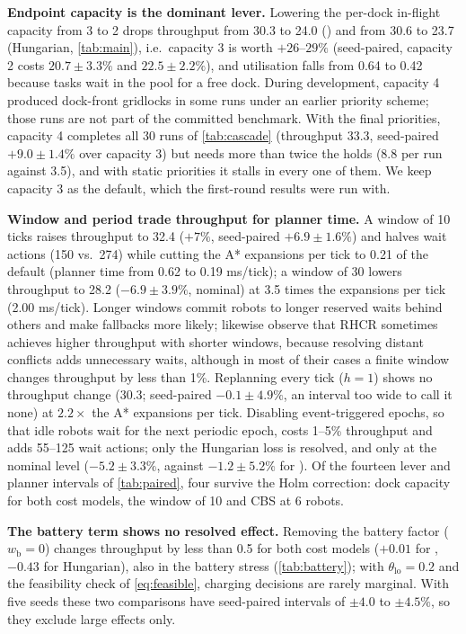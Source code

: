 \noindent\textbf{Endpoint capacity is the dominant lever.}
Lowering the per-dock in-flight capacity from 3 to 2 drops throughput from
30.3 to 24.0 (\sname) and from 30.6 to 23.7 (Hungarian, \cref{tab:main}),
i.e.\ capacity 3 is worth $+26$--$29\%$ (seed-paired, capacity 2 costs
$20.7\pm3.3\%$ and $22.5\pm2.2\%$), and utilisation falls from 0.64 to
0.42 because tasks wait in the pool for a free dock. During development,
capacity 4 produced dock-front gridlocks in some runs under an earlier
priority scheme; those runs are not part of the committed benchmark. With the final priorities, capacity 4 completes all 30 runs
of \cref{tab:cascade} (throughput 33.3, seed-paired $+9.0\pm1.4\%$ over capacity 3) but needs more than twice the holds (8.8 per run against 3.5), and
with static priorities it stalls in every one of them. We keep capacity 3 as
the default, which the first-round results were run with.

\noindent\textbf{Window and period trade throughput for planner time.}
A window of 10 ticks raises throughput to 32.4 ($+7\%$, seed-paired
$+6.9\pm1.6\%$) and halves wait actions (150 vs.\ 274) while cutting
the A* expansions per tick to 0.21 of the default
(planner time from 0.62 to 0.19 ms/tick); a window of 30 lowers throughput to
28.2 ($-6.9\pm3.9\%$, nominal) at 3.5 times the expansions per tick (2.00 ms/tick). Longer
windows commit robots to longer reserved waits behind others and make
fallbacks more likely; \citet{li2021rhcr} likewise observe that RHCR
sometimes achieves higher throughput with shorter windows, because resolving
distant conflicts adds unnecessary waits, although in most of their cases a
finite window changes throughput by less than 1\%. Replanning every tick ($h=1$) shows no throughput change (30.3;
seed-paired $-0.1\pm4.9\%$, an interval too wide to call it none) at
$2.2\times$ the A* expansions per tick. Disabling event-triggered epochs, so that idle
robots wait for the next periodic epoch, costs 1--5\% throughput and adds
55--125 wait actions; only the Hungarian loss is resolved, and only at the
nominal level ($-5.2\pm3.3\%$, against $-1.2\pm5.2\%$ for \sname). Of the
fourteen lever and planner intervals of \cref{tab:paired}, four survive the
Holm correction: dock capacity for both cost models, the window of 10 and
CBS at 6 robots.

\noindent\textbf{The battery term shows no resolved effect.}
Removing the battery factor ($w_{\mathrm{b}}=0$) changes throughput by less
than 0.5 for both cost models ($+0.01$ for \sname, $-0.43$ for Hungarian),
also in the battery stress (\cref{tab:battery}); with $\theta_{\mathrm{lo}}=0.2$ and the feasibility
check of \cref{eq:feasible}, charging decisions are rarely marginal. With
five seeds these two comparisons have seed-paired intervals of
$\pm4.0$ to $\pm4.5\%$, so they exclude large effects only.

